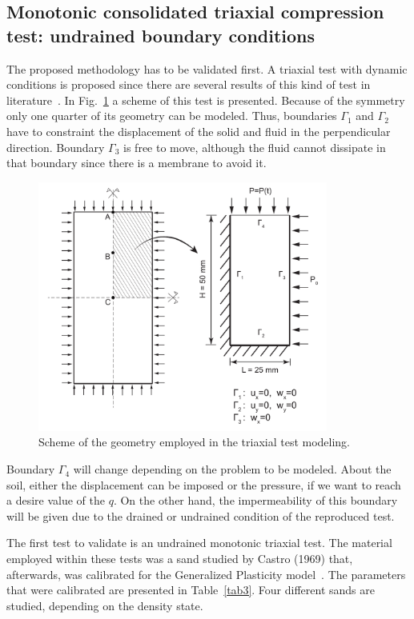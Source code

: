 \documentclass[preprint,12pt,a4paper]{elsarticle}
\begin{document}
\subsection{Monotonic consolidated triaxial compression test: undrained boundary conditions}
\label{sec:31}
The proposed methodology has to be validated first. A triaxial test with dynamic conditions is proposed since there are several results of this kind of test in literature~\cite{PastorZC:90,Zienkiewicz99}. In Fig.~\ref{fig_Geo} a scheme of this test is presented. Because of the symmetry only one quarter of its geometry can be modeled. Thus, boundaries $\Gamma_1$ and $\Gamma_2$ have to constraint the displacement of the solid and fluid in the perpendicular direction. Boundary $\Gamma_3$ is free to move, although the fluid cannot dissipate in that boundary since there is a membrane to avoid it.

\begin{figure}
\centering
\includegraphics[width=0.85\textwidth]{Figs/Geo.pdf}
\caption{Scheme of the geometry employed in the triaxial test modeling.}
\label{fig_Geo}
\end{figure}

Boundary $\Gamma_4$ will change depending on the problem to be modeled. About the soil, either the displacement can be imposed or the pressure, if we want to reach a desire value of the $q$. On the other hand, the impermeability of this boundary will be given due to the drained or undrained condition of the reproduced test.

The first test to validate is an undrained monotonic triaxial test. The material employed within these tests was a sand studied by Castro (1969) that, afterwards, was calibrated for the Generalized Plasticity model~\cite{PastorZC:90,Zienkiewicz99}. The parameters that were calibrated are presented in Table~\ref{tab3}. Four different sands are studied, depending on the density state.
\end{document}
